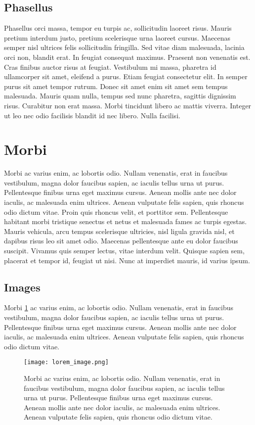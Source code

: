 \subsection{Phasellus}
Phasellus orci massa, tempor eu turpis ac, sollicitudin laoreet risus. Mauris pretium interdum justo, pretium scelerisque urna laoreet cursus. Maecenas semper nisl ultrices felis sollicitudin fringilla. Sed vitae diam malesuada, lacinia orci non, blandit erat. In feugiat consequat maximus. Praesent non venenatis est. Cras finibus auctor risus at feugiat. Vestibulum mi massa, pharetra id ullamcorper sit amet, eleifend a purus. Etiam feugiat consectetur elit. In semper purus sit amet tempor rutrum. Donec sit amet enim sit amet sem tempus malesuada. Mauris quam nulla, tempus sed nunc pharetra, sagittis dignissim risus. Curabitur non erat massa. Morbi tincidunt libero ac mattis viverra. Integer ut leo nec odio facilisis blandit id nec libero. Nulla facilisi.
\section{Morbi}
Morbi ac varius enim, ac lobortis odio. Nullam venenatis, erat in faucibus vestibulum, magna dolor faucibus sapien, ac iaculis tellus urna ut purus. Pellentesque finibus urna eget maximus cursus. Aenean mollis ante nec dolor iaculis, ac malesuada enim ultrices. Aenean vulputate felis sapien, quis rhoncus odio dictum vitae. Proin quis rhoncus velit, et porttitor sem. Pellentesque habitant morbi tristique senectus et netus et malesuada fames ac turpis egestas. Mauris vehicula, arcu tempus scelerisque ultricies, nisl ligula gravida nisl, et dapibus risus leo sit amet odio. Maecenas pellentesque ante eu dolor faucibus suscipit. Vivamus quis semper lectus, vitae interdum velit. Quisque sapien sem, placerat et tempor id, feugiat ut nisi. Nunc at imperdiet mauris, id varius ipsum.


\subsection{Images}

Morbi \ref{fig:template_cat_c} ac varius enim, ac lobortis odio. Nullam venenatis, erat in faucibus vestibulum, magna dolor faucibus sapien, ac iaculis tellus urna ut purus. Pellentesque finibus urna eget maximus cursus. Aenean mollis ante nec dolor iaculis, ac malesuada enim ultrices. Aenean vulputate felis sapien, quis rhoncus odio dictum vitae.

\begin{figure}[h!]
\texttt{[image: lorem\_image.png]} 
\centering
\caption{Morbi ac varius enim, ac lobortis odio. Nullam venenatis, erat in faucibus vestibulum, magna dolor faucibus sapien, ac iaculis tellus urna ut purus. Pellentesque finibus urna eget maximus cursus. Aenean mollis ante nec dolor iaculis, ac malesuada enim ultrices. Aenean vulputate felis sapien, quis rhoncus odio dictum vitae.}
\label{fig:template_cat_c}
\end{figure}

